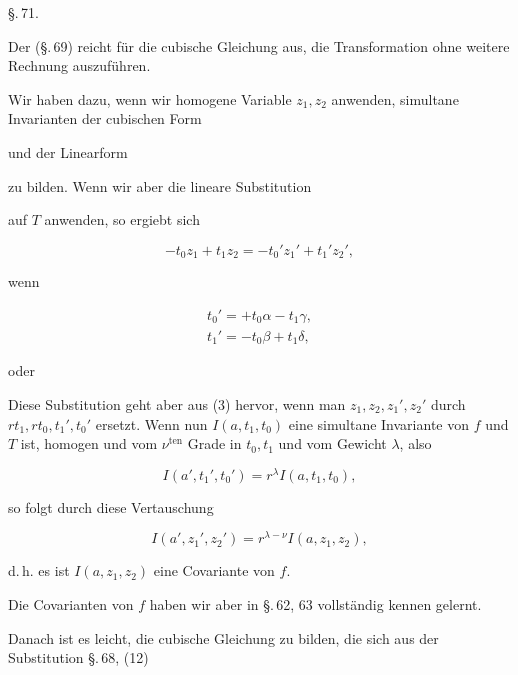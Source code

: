 
\begin{center}
\S.\,71.

\end{center}

Der  (\S.\,69) reicht für die cubische Gleichung aus, die Transformation ohne weitere Rechnung auszuführen.

Wir haben dazu, wenn wir homogene Variable $z_1, z_2$ anwenden, simultane Invarianten der cubischen Form


und der Linearform


zu bilden. Wenn wir aber die lineare Substitution


auf $T$ anwenden, so ergiebt sich

\[ -t_0z_1 + t_1z_2 = -t_0'z_1' + t_1'z_2', \]

wenn

\[ \begin{gathered} t_0' = +t_0\alpha - t_1\gamma, \\ t_1' = -t_0\beta + t_1\delta, \end{gathered} \]

oder


Diese Substitution geht aber aus (3) hervor, wenn man $z_1, z_2, z_1', z_2'$ durch $rt_1, rt_0, t_1', t_0'$ ersetzt. Wenn nun $I(a,t_1,t_0)$ eine simultane Invariante von $f$ und $T$ ist, homogen und vom $\nu^{\mathrm{ten}}$ Grade in $t_0, t_1$ und vom Gewicht $\lambda$, also

\[ I(a',t_1',t_0') = r^\lambda I(a,t_1,t_0), \]

so folgt durch diese Vertauschung

\[ I(a',z_1',z_2') = r^{\lambda-\nu}I(a,z_1,z_2), \]

d.\,h. es ist $I(a,z_1,z_2)$ eine Covariante von $f$.


Die Covarianten von $f$ haben wir aber in \S.\,62, 63 vollständig kennen gelernt.

Danach ist es leicht, die cubische Gleichung zu bilden, die sich aus der Substitution \S.\,68, (12)
